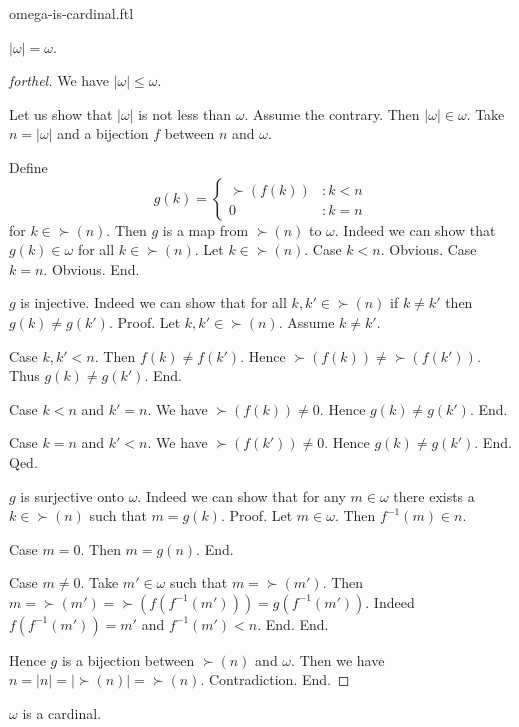 \documentclass{naproche-library}
\begin{document}
\begin{smodule}[title=$\omega$ is a Cardinal Number]{omega-is-cardinal.ftl}

\begin{proposition}[forthel,id=SET_THEORY_07_4952029518626816]
  $|\omega| = \omega$.
\end{proposition}
\begin{proof}[forthel]
  We have $|\omega| \leq \omega$.

  Let us show that $|\omega|$ is not less than $\omega$.
    Assume the contrary.
    Then $|\omega| \in \omega$.
    Take $n = |\omega|$ and a bijection $f$ between $n$ and $\omega$.

    Define \[ g(k) =
      \begin{cases}
        \succ(f(k)) & : k < n
        \\
        0           & : k = n
      \end{cases} \]
    for $k \in \succ(n)$.
    Then $g$ is a map from $\succ(n)$ to $\omega$.
    Indeed we can show that $g(k) \in \omega$ for all $k \in \succ(n)$.
      Let $k \in \succ(n)$.
      Case $k < n$. Obvious.
      Case $k = n$. Obvious.
    End.

    $g$ is injective.
    Indeed we can show that for all $k, k' \in \succ(n)$ if $k \neq k'$
    then $g(k) \neq g(k')$. \newline
    Proof.
      Let $k, k' \in \succ(n)$.
      Assume $k \neq k'$.

      Case $k, k' < n$.
        Then $f(k) \neq f(k')$.
        Hence $\succ(f(k)) \neq \succ(f(k'))$.
        Thus $g(k) \neq g(k')$.
      End.

      Case $k < n$ and $k' = n$.
        We have $\succ(f(k)) \neq 0$.
        Hence $g(k) \neq g(k')$.
      End.

      Case $k = n$ and $k' < n$.
        We have $\succ(f(k')) \neq 0$.
        Hence $g(k) \neq g(k')$.
      End.
    Qed.

    $g$ is surjective onto $\omega$.
    Indeed we can show that for any $m \in \omega$ there exists a $k \in \succ(n)$ such that $m = g(k)$. \newline
    Proof.
      Let $m \in \omega$.
      Then $f^{-1}(m) \in n$.

      Case $m = 0$.
        Then $m = g(n)$.
      End.

      Case $m \neq 0$.
        Take $m' \in \omega$ such that $m = \succ(m')$.
        Then $m
          = \succ(m')
          = \succ(f(f^{-1}(m')))
          = g(f^{-1}(m'))$.
        Indeed $f(f^{-1}(m')) = m'$ and $f^{-1}(m') < n$.
      End.
    End.

    Hence $g$ is a bijection between $\succ(n)$ and $\omega$.
    Then we have $n
      = |n|
      = |\succ(n)|
      = \succ(n)$.
    Contradiction.
  End.
\end{proof}

\begin{corollary}[forthel,id=SET_THEORY_07_2717623053713408]
  $\omega$ is a cardinal.
\end{corollary}
\end{smodule}
\end{document}
